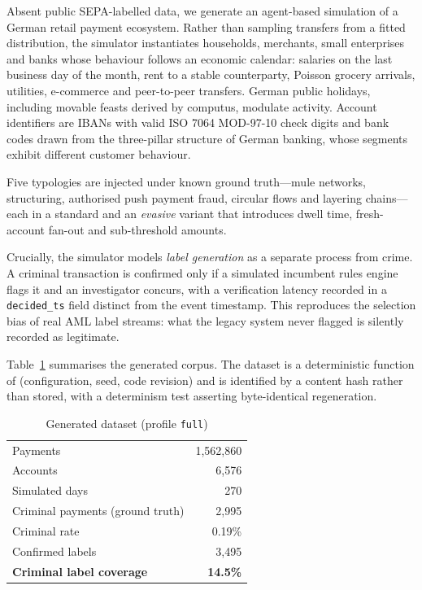 \documentclass[conference]{IEEEtran}
\begin{document}
Absent public SEPA-labelled data, we generate an agent-based simulation of a
German retail payment ecosystem. Rather than sampling transfers from a fitted
distribution, the simulator instantiates households, merchants, small
enterprises and banks whose behaviour follows an economic calendar: salaries on
the last business day of the month, rent to a stable counterparty, Poisson
grocery arrivals, utilities, e-commerce and peer-to-peer transfers. German
public holidays, including movable feasts derived by computus, modulate
activity. Account identifiers are IBANs with valid ISO 7064 MOD-97-10 check
digits and bank codes drawn from the three-pillar structure of German banking,
whose segments exhibit different customer behaviour.

Five typologies are injected under known ground truth---mule networks,
structuring, authorised push payment fraud, circular flows and layering
chains---each in a standard and an \emph{evasive} variant that introduces dwell
time, fresh-account fan-out and sub-threshold amounts.

Crucially, the simulator models \emph{label generation} as a separate process
from crime. A criminal transaction is confirmed only if a simulated incumbent
rules engine flags it and an investigator concurs, with a verification latency
recorded in a \texttt{decided\_ts} field distinct from the event timestamp. This
reproduces the selection bias of real AML label streams: what the legacy system
never flagged is silently recorded as legitimate.

Table~\ref{tab:dataset} summarises the generated corpus. The dataset is a
deterministic function of (configuration, seed, code revision) and is identified
by a content hash rather than stored, with a determinism test asserting
byte-identical regeneration.

\begin{table}[t]
\caption{Generated dataset (profile \texttt{full})}
\label{tab:dataset}
\centering
\begin{tabular}{lr}
\toprule
Payments & 1{,}562{,}860 \\
Accounts & 6{,}576 \\
Simulated days & 270 \\
Criminal payments (ground truth) & 2{,}995 \\
Criminal rate & 0.19\% \\
Confirmed labels & 3{,}495 \\
\textbf{Criminal label coverage} & \textbf{14.5\%} \\
\bottomrule
\end{tabular}
\end{table}
\end{document}
